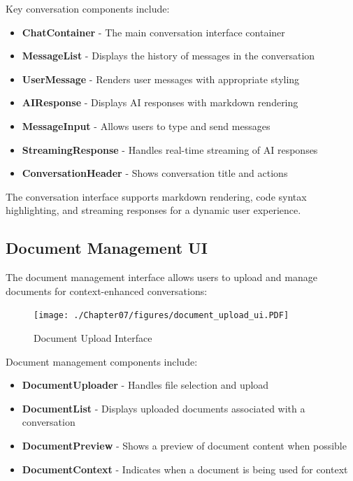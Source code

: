 Key conversation components include:

\begin{itemize}
  \item \textbf{ChatContainer} - The main conversation interface container
  \item \textbf{MessageList} - Displays the history of messages in the conversation
  \item \textbf{UserMessage} - Renders user messages with appropriate styling
  \item \textbf{AIResponse} - Displays AI responses with markdown rendering
  \item \textbf{MessageInput} - Allows users to type and send messages
  \item \textbf{StreamingResponse} - Handles real-time streaming of AI responses
  \item \textbf{ConversationHeader} - Shows conversation title and actions
\end{itemize}

The conversation interface supports markdown rendering, code syntax highlighting, and streaming responses for a dynamic user experience.

\subsection{Document Management UI}

The document management interface allows users to upload and manage documents for context-enhanced conversations:

\begin{figure}
    \centering
    \texttt{[image: ./Chapter07/figures/document\_upload\_ui.PDF]}
    \caption{Document Upload Interface}
    \label{fig:document-upload-ui}
\end{figure}
\clearpage

Document management components include:

\begin{itemize}
  \item \textbf{DocumentUploader} - Handles file selection and upload
  \item \textbf{DocumentList} - Displays uploaded documents associated with a conversation
  \item \textbf{DocumentPreview} - Shows a preview of document content when possible
  \item \textbf{DocumentContext} - Indicates when a document is being used for context
\end{itemize}

